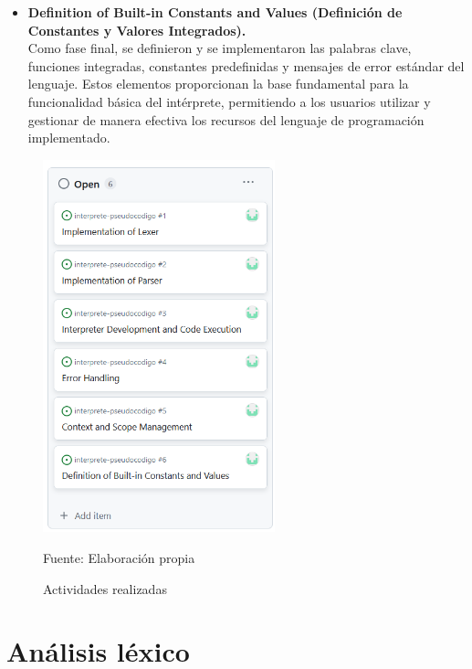 \begin{itemize}
  \item \textbf{Definition of Built-in Constants and Values (Definición de Constantes y Valores Integrados).} \\
  Como fase final, se definieron y se implementaron las palabras clave, funciones integradas, constantes predefinidas y mensajes de error estándar del lenguaje. Estos elementos proporcionan la base fundamental para la funcionalidad básica del intérprete, permitiendo a los usuarios utilizar y gestionar de manera efectiva los recursos del lenguaje de programación implementado.
\end{itemize}

\begin{figure}[!h]
  \centering
  \includegraphics[width=0.6\textwidth]{images/actividades.png}
  \caption{Actividades realizadas}
  \centering Fuente: Elaboración propia
  \label{fig:actividades}
\end{figure}

\section{Análisis léxico}
